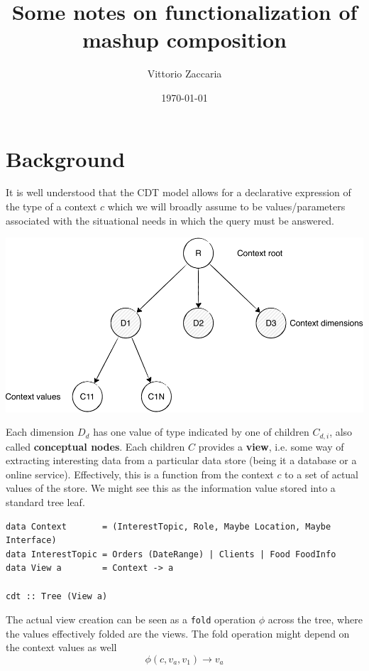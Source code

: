\documentclass[12pt,a4]{article}
\author{Vittorio Zaccaria}
\date{\today}
\title{Some notes on functionalization of mashup composition}
\begin{document}
\maketitle
\tableofcontents


\section{Background}
\label{sec:orgheadline1}

It is well understood that the CDT model allows for a declarative expression of
the type of a context \(c\) which we will broadly assume to be values/parameters
associated with the situational needs in which the query must be answered.

\vspace{0.5cm}
\includegraphics[width=.9\linewidth]{./key/page-1-crop.pdf}
\vspace{0.5cm}

Each dimension \(D_d\) has one value of type indicated by one of children
\(C_{d,i}\), also called \textbf{conceptual nodes}. Each children \(C\) provides a \textbf{view}, i.e.
some way of extracting interesting data from a particular data store (being it a
database or a online service). Effectively, this is a function from the context
\(c\) to a set of actual values of the store. We might see this as the information
value stored into a standard tree leaf.

\begin{verbatim}
data Context       = (InterestTopic, Role, Maybe Location, Maybe Interface)
data InterestTopic = Orders (DateRange) | Clients | Food FoodInfo
data View a        = Context -> a

cdt :: Tree (View a)
\end{verbatim}

The actual view creation can be seen as a \texttt{fold} operation \(\phi\) across the tree, where
the values effectively folded are the views. The fold operation might depend on
the context values as well \[ \phi(c, v_a, v_1) \rightarrow v_a \]
\end{document}
